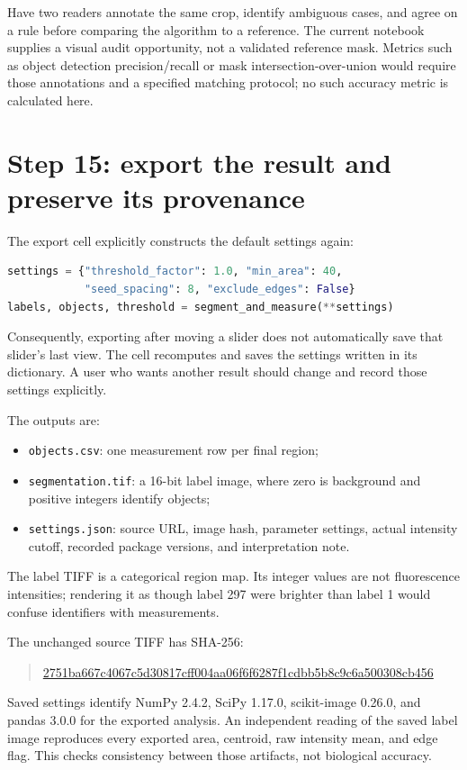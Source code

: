 \documentclass[11pt,letterpaper]{article}
\newcommand{\field}[1]{\nolinkurl{#1}}
\begin{document}
Have two readers annotate the same crop, identify ambiguous cases, and agree on a rule before comparing the algorithm to a reference. The current notebook supplies a visual audit opportunity, not a validated reference mask. Metrics such as object detection precision/recall or mask intersection-over-union would require those annotations and a specified matching protocol; no such accuracy metric is calculated here.

\section{Step 15: export the result and preserve its provenance}
\label{sec:export}

The export cell explicitly constructs the default settings again:
\begin{lstlisting}[language=Python]
settings = {"threshold_factor": 1.0, "min_area": 40,
            "seed_spacing": 8, "exclude_edges": False}
labels, objects, threshold = segment_and_measure(**settings)
\end{lstlisting}
Consequently, exporting after moving a slider does not automatically save that slider's last view. The cell recomputes and saves the settings written in its dictionary. A user who wants another result should change and record those settings explicitly.

The outputs are:
\begin{itemize}
  \item \field{objects.csv}: one measurement row per final region;
  \item \field{segmentation.tif}: a 16-bit label image, where zero is background and positive integers identify objects;
  \item \field{settings.json}: source URL, image hash, parameter settings, actual intensity cutoff, recorded package versions, and interpretation note.
\end{itemize}
The label TIFF is a categorical region map. Its integer values are not fluorescence intensities; rendering it as though label 297 were brighter than label 1 would confuse identifiers with measurements.

The unchanged source TIFF has SHA-256:
\begin{quote}\small
\url{2751ba667c4067c5d30817cff004aa06f6f6287f1cdbb5b8c9c6a500308cb456}
\end{quote}
Saved settings identify NumPy 2.4.2, SciPy 1.17.0, scikit-image 0.26.0, and pandas 3.0.0 for the exported analysis. An independent reading of the saved label image reproduces every exported area, centroid, raw intensity mean, and edge flag. This checks consistency between those artifacts, not biological accuracy.
\end{document}
